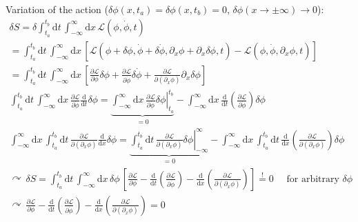 \documentclass[fontsize=11pt,a4paper]{scrartcl}
\begin{document}
Variation of the action ($\delta\phi(x,t_a)=\delta\phi(x,t_b)=0$, $\delta\phi(x\to\pm\infty)\to 0$):
\begin{gather*}
	\delta S=\delta\int_{t_a}^{t_b}\mathrm{d}t\,\int_{-\infty}^\infty\mathrm{d}x\,\mathcal{L}(\phi,\dot\phi,t)\\=\int_{t_a}^{t_b}\mathrm{d}t\,\int_{-\infty}^\infty\mathrm{d}x\,\left[\mathcal{L}(\phi+\delta\phi, \dot\phi+\delta\dot\phi, \partial_x\phi+\partial_x\delta\phi, t) - \mathcal{L}(\phi,\dot\phi,\partial_x\phi, t)\right]\\
	=\int_{t_a}^{t_b}\mathrm{d}t\,\int_{-\infty}^\infty\mathrm{d}x\,\left[\frac{\partial\mathcal{L}}{\partial\phi}\delta\phi + \frac{\partial\mathcal{L}}{\partial\dot\phi}\delta\dot\phi + \frac{\partial\mathcal{L}}{\partial(\partial_x\phi)}\partial_x\delta\phi\right]\\
	\int_{t_a}^{t_b}\mathrm{d}t\,\int_{-\infty}^\infty\mathrm{d}x\,\frac{\partial\mathcal{L}}{\partial\dot\phi}\frac{\mathrm{d}}{\mathrm{d}t}\delta\phi = \underbrace{\left.\int_{-\infty}^\infty\mathrm{d}x\, \frac{\partial\mathcal{L}}{\partial\dot\phi}\delta\phi\right|_{t_a}^{t_b}}_{=0} - \int_{-\infty}^\infty\mathrm{d}x\,\frac{\mathrm{d}}{\mathrm{d}t}\left(\frac{\partial\mathcal{L}}{\partial\dot\phi}\right)\delta\phi\\
	\int_{-\infty}^\infty\mathrm{d}x\,\int_{t_a}^{t_b}\mathrm{d}t\,\frac{\partial\mathcal{L}}{\partial(\partial_x\phi)}\frac{\mathrm{d}}{\mathrm{d}x}\delta\phi = \underbrace{\left.\int_{t_a}^{t_b}\mathrm{d}t\, \frac{\partial\mathcal{L}}{\partial(\partial_x\phi)}\delta\phi\right|_{-\infty}^\infty}_{=0} - \int_{-\infty}^\infty\mathrm{d}x\,\int_{t_a}^{t_b}\mathrm{d}t\, \frac{\mathrm{d}}{\mathrm{d}x}\left(\frac{\partial\mathcal{L}}{\partial(\partial_x\phi)}\right)\delta\phi\\
	\curvearrowright\,\delta S=\int_{t_a}^{t_b}\mathrm{d}t\,\int_{-\infty}^\infty\mathrm{d}x\, \delta\phi\,\left[\frac{\partial\mathcal{L}}{\partial\phi} - \frac{\mathrm{d}}{\mathrm{d}t}\left(\frac{\partial\mathcal{L}}{\partial\dot\phi}\right) - \frac{\mathrm{d}}{\mathrm{d}x}\left(\frac{\partial\mathcal{L}}{\partial(\partial_x\phi)}\right)\right]\stackrel{!}{=}0\quad\text{ for arbitrary }\delta\phi\\
	\curvearrowright\,\frac{\partial\mathcal{L}}{\partial\phi} - \frac{\mathrm{d}}{\mathrm{d}t}\left(\frac{\partial\mathcal{L}}{\partial\dot\phi}\right) - \frac{\mathrm{d}}{\mathrm{d}x}\left(\frac{\partial\mathcal{L}}{\partial(\partial_x\phi)}\right)=0
\end{gather*}
\end{document}
